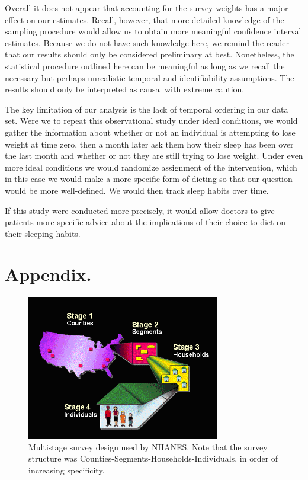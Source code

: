 \documentclass{article}
\begin{document}
Overall it does not appear that accounting for the survey weights has a major effect on our estimates. Recall, however, that more detailed knowledge of the sampling procedure would allow us to obtain more meaningful confidence interval estimates. Because we do not have such knowledge here, we remind the reader that our results should only be considered preliminary at best. Nonetheless, the statistical procedure outlined here can be meaningful as long as we recall the necessary but perhaps unrealistic temporal and identifiability assumptions. The results should only be interpreted as causal with extreme caution.

The key limitation of our analysis is the lack of temporal ordering in our data set. Were we to repeat this observational study under ideal conditions, we would gather the information about whether or not an individual is attempting to lose weight at time zero, then a month later ask them how their sleep has been over the last month and whether or not they are still trying to lose weight. Under even more ideal conditions we would randomize assignment of the intervention, which in this case we would make a more specific form of dieting so that our question would be more well-defined. We would then track sleep habits over time.

If this study were conducted more precisely, it would allow doctors to give patients more specific advice about the implications of their choice to diet on their sleeping habits.


{}



\section*{Appendix.}
\begin{figure}
\centering
\includegraphics[width=0.75\textwidth]{figures/Survey_Design.PNG}
\caption{Multistage survey design used by NHANES. Note that the survey structure was Counties-Segments-Households-Individuals, in order of increasing specificity.}
\label{fig:survey.design}
\end{figure}
\end{document}
